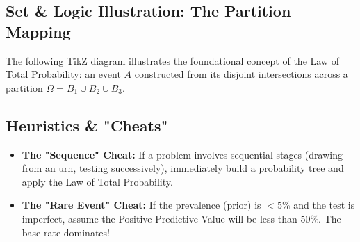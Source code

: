 \documentclass[12pt]{article}
\theoremstyle{definition}
\theoremstyle{remark}
\newcommand{\OmegaSet}{\Omega}
\begin{document}
\subsection{Set \& Logic Illustration: The Partition Mapping}
The following TikZ diagram illustrates the foundational concept of the Law of Total Probability: an event $A$ constructed from its disjoint intersections across a partition $\OmegaSet = B_1 \cup B_2 \cup B_3$.

\vspace{0.5cm}
\begin{center}
\end{center}
\vspace{0.5cm}

\subsection{Heuristics \& "Cheats"}
\begin{itemize}
    \item \textbf{The "Sequence" Cheat:} If a problem involves sequential stages (drawing from an urn, testing successively), immediately build a probability tree and apply the Law of Total Probability.
    \item \textbf{The "Rare Event" Cheat:} If the prevalence (prior) is $< 5\%$ and the test is imperfect, assume the Positive Predictive Value will be less than $50\%$. The base rate dominates!
\end{itemize}
\end{document}
